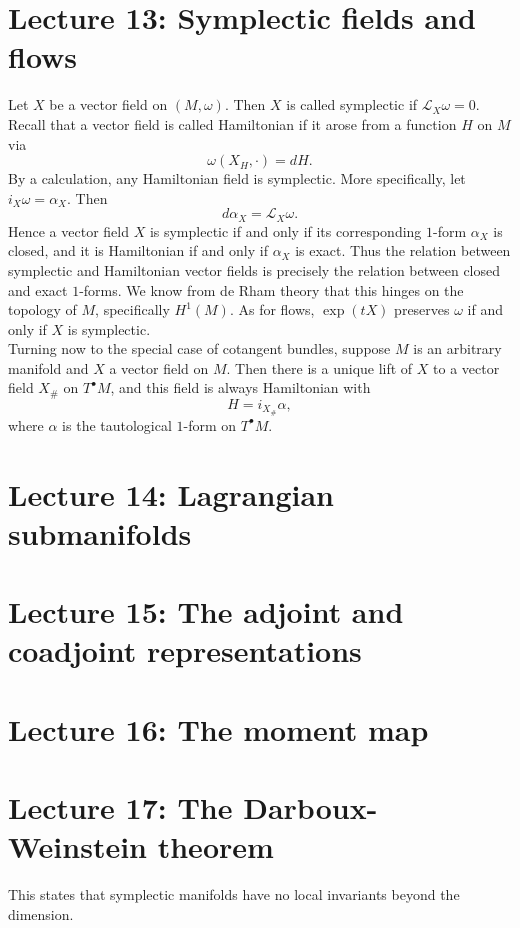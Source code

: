 \documentclass[11pt]{article} %
\begin{document}
\section*{Lecture 13: Symplectic fields and flows}
Let $X$ be a vector field on $(M,\omega)$. Then $X$ is called symplectic if $\mathscr{L}_X \omega = 0$. Recall that a vector field is called Hamiltonian if it arose from a function $H$ on $M$ via
$$
\omega (X_H, \cdot) = dH.
$$
By a calculation, any Hamiltonian field is symplectic. More specifically, let $i_X\omega = \alpha_X$. Then
$$
d\alpha_X = \mathscr{L}_X \omega.
$$
Hence a vector field $X$ is symplectic if and only if its corresponding $1$-form $\alpha_X$ is closed, and it is Hamiltonian if and only if $\alpha_X$ is exact. Thus the relation between symplectic and Hamiltonian vector fields is precisely the relation between closed and exact $1$-forms. We know from de Rham theory that this hinges on the topology of $M$, specifically $H^1(M)$. As for flows, $\operatorname{exp}(tX)$ preserves $\omega$ if and only if $X$ is symplectic. \\
Turning now to the special case of cotangent bundles, suppose $M$ is an arbitrary manifold and $X$ a vector field on $M$. Then there is a unique lift of $X$ to a vector field $X_\#$ on $T^\bullet M$, and this field is always Hamiltonian with 
$$
H = i_{X_\#}\alpha,
$$
where $\alpha$ is the tautological $1$-form on $T^\bullet M$.


\section*{Lecture 14: Lagrangian submanifolds}


\section*{Lecture 15: The adjoint and coadjoint representations}

\section*{Lecture 16: The moment map} 

\section*{Lecture 17: The Darboux-Weinstein theorem}
This states that symplectic manifolds have no local invariants beyond the dimension. 
\end{document}
